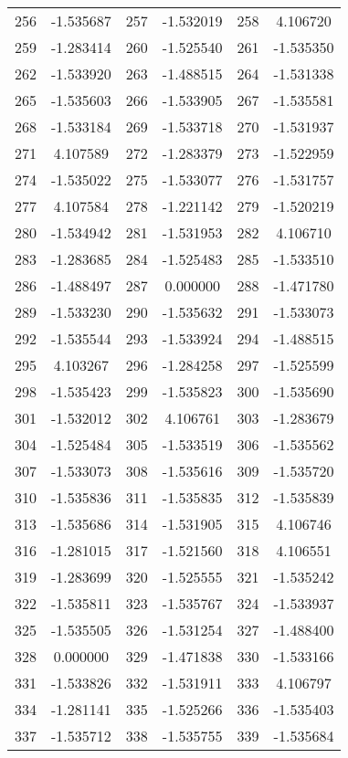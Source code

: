 \documentclass[12pt]{article}
\begin{document}
\begin{longtable}{@{}cc|cc|cc@{}}
256 & -1.535687 & 257 & -1.532019 & 258 & 4.106720 \\
259 & -1.283414 & 260 & -1.525540 & 261 & -1.535350 \\
262 & -1.533920 & 263 & -1.488515 & 264 & -1.531338 \\
265 & -1.535603 & 266 & -1.533905 & 267 & -1.535581 \\
268 & -1.533184 & 269 & -1.533718 & 270 & -1.531937 \\
271 & 4.107589 & 272 & -1.283379 & 273 & -1.522959 \\
274 & -1.535022 & 275 & -1.533077 & 276 & -1.531757 \\
277 & 4.107584 & 278 & -1.221142 & 279 & -1.520219 \\
280 & -1.534942 & 281 & -1.531953 & 282 & 4.106710 \\
283 & -1.283685 & 284 & -1.525483 & 285 & -1.533510 \\
286 & -1.488497 & 287 & 0.000000 & 288 & -1.471780 \\
289 & -1.533230 & 290 & -1.535632 & 291 & -1.533073 \\
292 & -1.535544 & 293 & -1.533924 & 294 & -1.488515 \\
295 & 4.103267 & 296 & -1.284258 & 297 & -1.525599 \\
298 & -1.535423 & 299 & -1.535823 & 300 & -1.535690 \\
301 & -1.532012 & 302 & 4.106761 & 303 & -1.283679 \\
304 & -1.525484 & 305 & -1.533519 & 306 & -1.535562 \\
307 & -1.533073 & 308 & -1.535616 & 309 & -1.535720 \\
310 & -1.535836 & 311 & -1.535835 & 312 & -1.535839 \\
313 & -1.535686 & 314 & -1.531905 & 315 & 4.106746 \\
316 & -1.281015 & 317 & -1.521560 & 318 & 4.106551 \\
319 & -1.283699 & 320 & -1.525555 & 321 & -1.535242 \\
322 & -1.535811 & 323 & -1.535767 & 324 & -1.533937 \\
325 & -1.535505 & 326 & -1.531254 & 327 & -1.488400 \\
328 & 0.000000 & 329 & -1.471838 & 330 & -1.533166 \\
331 & -1.533826 & 332 & -1.531911 & 333 & 4.106797 \\
334 & -1.281141 & 335 & -1.525266 & 336 & -1.535403 \\
337 & -1.535712 & 338 & -1.535755 & 339 & -1.535684 \\

\end{longtable}
\end{document}
